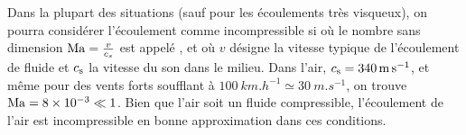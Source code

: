 \documentclass[12pt,fancy]{cours}
\begin{document}

Dans la plupart des situations (sauf pour les écoulements très visqueux), on pourra considérer l'écoulement comme incompressible si
où le nombre sans dimension ${\rm Ma} = \frac{v}{c_s}$ est appelé , et où $v$ désigne la vitesse typique de l'écoulement de fluide et $c_{\rm{s}}$ la vitesse du son dans le milieu. Dans l'air, $c_{\rm{s}}=\SI{340}{m.s^{-1}}$, et même pour des vents forts soufflant à $\SI{100}{km.h^{-1}} \simeq \SI{30}{m.s^{-1}}$, on trouve ${\rm Ma} = \SI{8e-3}{} \ll 1$.
Bien que l'air soit un fluide compressible, l'écoulement de l'air est incompressible en bonne approximation dans ces conditions.
\end{document}
